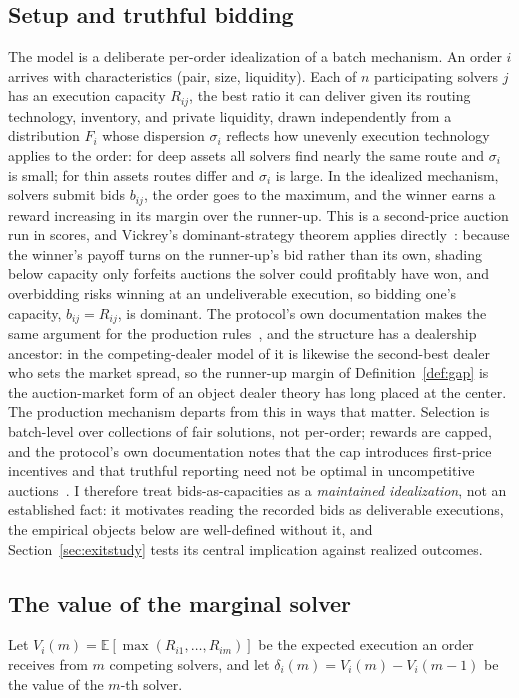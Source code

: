 \documentclass[11pt]{article}
\theoremstyle{plain}
\theoremstyle{definition}
\theoremstyle{remark}
\newcommand{\E}{\mathbb{E}}
\begin{document}
\subsection{Setup and truthful bidding}\label{sec:model-setup}
The model is a deliberate per-order idealization of a batch mechanism. An order $i$ arrives with characteristics (pair, size, liquidity). Each of $n$ participating solvers $j$ has an execution capacity $R_{ij}$, the best ratio it can deliver given its routing technology, inventory, and private liquidity, drawn independently from a distribution $F_i$ whose dispersion $\sigma_i$ reflects how unevenly execution technology applies to the order: for deep assets all solvers find nearly the same route and $\sigma_i$ is small; for thin assets routes differ and $\sigma_i$ is large. In the idealized mechanism, solvers submit bids $b_{ij}$, the order goes to the maximum, and the winner earns a reward increasing in its margin over the runner-up. This is a second-price auction run in scores, and Vickrey's dominant-strategy theorem applies directly~\citep{vickrey1961counterspeculation}: because the winner's payoff turns on the runner-up's bid rather than its own, shading below capacity only forfeits auctions the solver could profitably have won, and overbidding risks winning at an undeliverable execution, so bidding one's capacity, $b_{ij} = R_{ij}$, is dominant. The protocol's own documentation makes the same argument for the production rules~\citep{cowdao_rewards}, and the structure has a dealership ancestor: in the competing-dealer model of \citet{ho1983dynamics} it is likewise the second-best dealer who sets the market spread, so the runner-up margin of Definition~\ref{def:gap} is the auction-market form of an object dealer theory has long placed at the center. The production mechanism departs from this in ways that matter. Selection is batch-level over collections of fair solutions, not per-order; rewards are capped, and the protocol's own documentation notes that the cap introduces first-price incentives and that truthful reporting need not be optimal in uncompetitive auctions~\citep{cowdao_rewards,cowdao_rules}. I therefore treat bids-as-capacities as a \emph{maintained idealization}, not an established fact: it motivates reading the recorded bids as deliverable executions, the empirical objects below are well-defined without it, and Section~\ref{sec:exitstudy} tests its central implication against realized outcomes.

\subsection{The value of the marginal solver}\label{sec:model-value}
Let $V_i(m) = \E\!\left[\max(R_{i1},\dots,R_{im})\right]$ be the expected execution an order receives from $m$ competing solvers, and let $\delta_i(m) = V_i(m) - V_i(m-1)$ be the value of the $m$-th solver.
\end{document}

